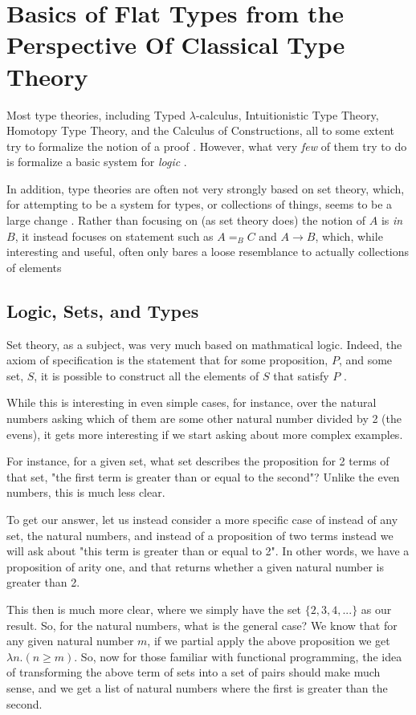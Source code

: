 \section{Basics of Flat Types from the Perspective Of Classical Type Theory}

Most type theories, including Typed $\lambda$-calculus, Intuitionistic Type Theory, Homotopy Type Theory, and the Calculus of Constructions, all to some extent try to formalize the notion of a proof \needcite.
However, what very \emph{few} of them try to do is formalize a basic system for \emph{logic} \needcite.

In addition, type theories are often not very strongly based on set theory, which, for attempting to be a system for types, or collections of things, seems to be a large change \needcite.
Rather than focusing on (as set theory does) the notion of $A$ is \emph{in} $B$, it instead focuses on statement such as $A {=}_{B} C$ and $A \to B$, which, while interesting and useful, often only bares a loose resemblance to actually collections of elements

\subsection{Logic, Sets, and Types}

Set theory, as a subject, was very much based on mathmatical logic.
Indeed, the axiom of specification is the statement that for some proposition, $P$, and some set, $S$, it is possible to construct all the elements of $S$ that satisfy $P$ \needcite.

While this is interesting in even simple cases, for instance, over the natural numbers asking which of them are some other natural number divided by 2 (the evens), it gets more interesting if we start asking about more complex examples.

For instance, for a given set, what set describes the proposition for 2 terms of that set, "the first term is greater than or equal to the second"?
Unlike the even numbers, this is much less clear.

To get our answer, let us instead consider a more specific case of instead of any set, the natural numbers, and instead of a proposition of two terms instead we will ask about "this term is greater than or equal to 2". 
In other words, we have a proposition of arity one, and that returns whether a given natural number is greater than 2.

This then is much more clear, where we simply have the set $\{2,3,4,...\}$ as our result.
So, for the natural numbers, what is the general case?
We know that for any given natural number $m$, if we partial apply the above proposition we get $\lambda n . (n \geq m)$.
So, now for those familiar with functional programming, the idea of transforming the above term of sets into a set of pairs should make much sense, and we get a list of natural numbers where the first is greater than the second.

